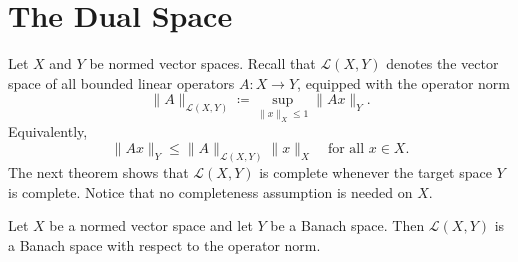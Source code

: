 \section{The Dual Space}
Let \(X\) and \(Y\) be normed vector spaces. Recall that \(\mathcal{L} (X, Y)\) denotes the vector space of all bounded linear operators \(A: X \to Y\), equipped with the operator norm 
\[
    \lVert A \rVert_{\mathcal{L} (X, Y)} \coloneqq \sup _{\lVert x \rVert_X \le 1} \lVert Ax \rVert_Y.  
\]
Equivalently,
\[
    \lVert Ax \rVert_Y \le \lVert A \rVert_{\mathcal{L} (X, Y)} \lVert x \rVert_X \quad \text{for all } x \in X.    
\]
The next theorem shows that \(\mathcal{L} (X, Y)\) is complete whenever the target space \(Y\) is complete. Notice that no completeness assumption is needed on \(X\). 

\begin{theorem}
    Let \(X\) be a normed vector space and let \(Y\) be a Banach space. Then \(\mathcal{L} (X, Y)\) is a Banach space with respect to the operator norm.   
\end{theorem}

